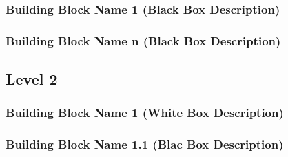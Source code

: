 \subsubsection{Building Block Name 1 (Black Box Description)}



\subsubsection{ Building Block Name n (Black Box Description)}


\subsection{Level 2}

\subsubsection{Building Block Name 1 (White Box Description)}


\subsubsection{Building Block Name 1.1 (Blac Box Description)}

